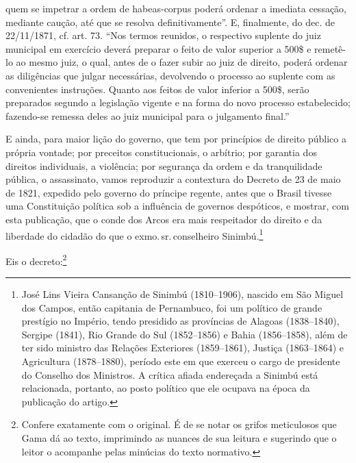 {  quem se impetrar a ordem de habeas-corpus poderá ordenar a imediata
  cessação, mediante caução, até que se resolva definitivamente''. E,
  finalmente, do dec. de 22/11/1871, cf. art. 73. ``Nos termos reunidos,
  o respectivo suplente do juiz municipal em exercício deverá preparar o
  feito de valor superior a 500\$ e remetê-lo ao mesmo juiz, o qual,
  antes de o fazer subir ao juiz de direito, poderá ordenar as
  diligências que julgar necessárias, devolvendo o processo ao suplente
  com as convenientes instruções. Quanto aos feitos de valor inferior a
  500\$, serão preparados segundo a legislação vigente e na forma do
  novo processo estabelecido; fazendo-se remessa deles ao juiz municipal
  para o julgamento final.''}

E ainda, para maior lição do governo, que tem por princípios de direito
público a própria vontade; por preceitos constitucionais, o arbítrio;
por garantia dos direitos individuais, a violência; por segurança da
ordem e da tranquilidade pública, o assassinato, vamos reproduzir a
contextura do Decreto de 23 de maio de 1821, expedido pelo governo do
príncipe regente, antes que o Brasil tivesse uma Constituição política
sob a influência de governos despóticos, e mostrar, com esta publicação,
que o conde dos Arcos era mais respeitador do direito e da liberdade do
cidadão do que o exmo.\,sr.\,conselheiro Sinimbú.\footnote{José Lins
  Vieira Cansanção de Sinimbú (1810--1906), nascido em São Miguel dos
  Campos, então capitania de Pernambuco, foi um político de grande
  prestígio no Império, tendo presidido as províncias de Alagoas
  (1838--1840), Sergipe (1841), Rio Grande do Sul (1852--1856) e Bahia
  (1856--1858), além de ter sido ministro das Relações Exteriores
  (1859--1861), Justiça (1863--1864) e Agricultura (1878--1880), período
  este em que exerceu o cargo de presidente do Conselho dos Ministros. A
  crítica afiada endereçada a Sinimbú está relacionada, portanto, ao
  posto político que ele ocupava na época da publicação do artigo.}

Eis o decreto:\footnote{Confere exatamente com o original. É de se
  notar os grifos meticulosos que Gama dá ao texto, imprimindo as
  nuances de sua leitura e sugerindo que o leitor o acompanhe pelas
  minúcias do texto normativo.}

